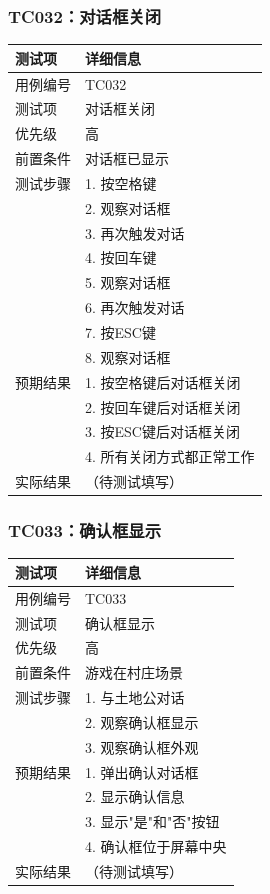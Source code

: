 \documentclass[a4paper,12pt]{article}
\begin{document}
\subsubsection{TC032：对话框关闭}
\begin{table}[h]
\centering
\begin{tabular}{ll}
\toprule
测试项 & 详细信息 \\
\midrule
用例编号 & TC032 \\
测试项 & 对话框关闭 \\
优先级 & 高 \\
前置条件 & 对话框已显示 \\
测试步骤 & 1. 按空格键 \\
 & 2. 观察对话框 \\
 & 3. 再次触发对话 \\
 & 4. 按回车键 \\
 & 5. 观察对话框 \\
 & 6. 再次触发对话 \\
 & 7. 按ESC键 \\
 & 8. 观察对话框 \\
预期结果 & 1. 按空格键后对话框关闭 \\
 & 2. 按回车键后对话框关闭 \\
 & 3. 按ESC键后对话框关闭 \\
 & 4. 所有关闭方式都正常工作 \\
实际结果 & （待测试填写） \\
\bottomrule
\end{tabular}
\end{table}

\subsubsection{TC033：确认框显示}
\begin{table}[h]
\centering
\begin{tabular}{ll}
\toprule
测试项 & 详细信息 \\
\midrule
用例编号 & TC033 \\
测试项 & 确认框显示 \\
优先级 & 高 \\
前置条件 & 游戏在村庄场景 \\
测试步骤 & 1. 与土地公对话 \\
 & 2. 观察确认框显示 \\
 & 3. 观察确认框外观 \\
预期结果 & 1. 弹出确认对话框 \\
 & 2. 显示确认信息 \\
 & 3. 显示"是"和"否"按钮 \\
 & 4. 确认框位于屏幕中央 \\
实际结果 & （待测试填写） \\
\bottomrule
\end{tabular}
\end{table}
\end{document}
